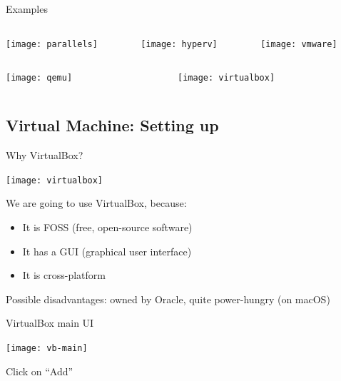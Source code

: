 \documentclass[12pt]{beamer}
\begin{document}
\begin{frame}{Examples}
  \begin{columns}
    \begin{column}{0.33\linewidth}
      \begin{center}
        \texttt{[image: parallels]}
      \end{center}
    \end{column}
    \begin{column}{0.33\linewidth}
      \texttt{[image: hyperv]}
    \end{column}
    \begin{column}{0.33\linewidth}
      \texttt{[image: vmware]}
    \end{column}
  \end{columns}
  \begin{columns}
    \begin{column}{0.5\linewidth}
      \texttt{[image: qemu]}
    \end{column}
    \begin{column}{0.5\linewidth}
      \begin{center}
        \texttt{[image: virtualbox]}
      \end{center}
    \end{column}
  \end{columns}
\end{frame}

\subsection{Virtual Machine: Setting up}
\begin{frame}{Why VirtualBox?}
  \begin{center}
    \texttt{[image: virtualbox]}
  \end{center}

  We are going to use VirtualBox, because:
  \begin{itemize}
    \item It is FOSS (free, open-source software)
    \item It has a GUI (graphical user interface)
    \item It is cross-platform
  \end{itemize}

  Possible disadvantages: owned by Oracle, quite power-hungry (on macOS)
\end{frame}

\begin{frame}{VirtualBox main UI}
  \begin{center}
    \texttt{[image: vb-main]}
  \end{center}
  Click on ``Add''
\end{frame}
\end{document}
